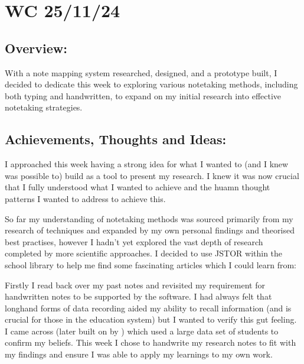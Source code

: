 \section{WC 25/11/24}

\subsection*{Overview:}
With a note mapping system researched, designed, and a prototype built, I decided to dedicate this week to exploring various notetaking methods, including both typing and handwritten, to expand on my initial research into effective notetaking strategies.

\subsection*{Achievements, Thoughts and Ideas:}
I approached this week having a strong idea for what I wanted to (and I knew was possible to) build as a tool to present my research. I knew it was now crucial that I fully understood what I wanted to achieve and the huamn thought patterns I wanted to address to achieve this. 

So far my understanding of notetaking methods was sourced primarily from my research of techniques and expanded by my own personal findings and theorised best practises, however I hadn't yet explored the vast depth of research completed by more scientific approaches. I decided to use JSTOR within the school library to help me find some fascinating articles which I could learn from:

Firstly I read back over my past notes and revisited  my requirement for handwritten notes to be supported by the software. I had always felt that longhand forms of data recording aided my ability to recall information (and is crucial for those in the education system) but I wanted to verify this gut feeling. I came across  (later built on by ) which used a large data set of students to confirm my beliefs. This week I chose to handwrite my research notes to fit with my findings and ensure I was able to apply my learnings to my own work.

